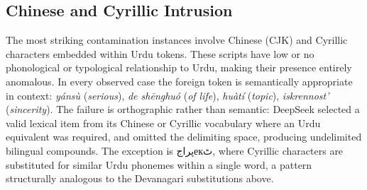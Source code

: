 \documentclass[11pt]{article}
\begin{document}
\subsection{Chinese and Cyrillic Intrusion}
\label{app:contamination_cjk_cyrillic}

The most striking contamination instances involve Chinese
(CJK) and Cyrillic characters embedded within Urdu tokens.
These scripts have low or no phonological or typological
relationship to Urdu, making their presence entirely
anomalous. In every observed case the foreign token is
semantically appropriate in context: \textit{yánsù}
(\textit{serious}), \textit{de shēnghuó}
(\textit{of life}), \textit{huàtí} (\textit{topic}),
\textit{iskrennost'} (\textit{sincerity}). The failure is
orthographic rather than semantic: DeepSeek selected a
valid lexical item from its Chinese or Cyrillic
vocabulary where an Urdu equivalent was required, and
omitted the delimiting space, producing undelimited
bilingual compounds. The exception is
\foreignlanguage{arabic}{پراج}\foreignlanguage{russian}{ек}\foreignlanguage{arabic}{ٹ},
where Cyrillic characters are substituted for similar Urdu
phonemes within a single word, a pattern structurally
analogous to the Devanagari substitutions above.
\begin{table}[ht]

\centering
\caption{Script Contamination Summary by Model}
\label{tab:script_contamination}
\end{table}
\end{document}
